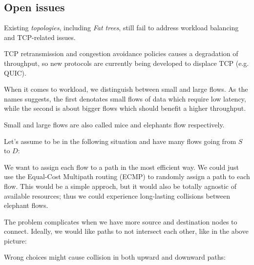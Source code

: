 \subsection{Open issues}
Existing \emph{topologies}, including \emph{Fat trees}, still fail to address
workload balancing and TCP-related issues.

\begin{note}
    TCP retransmission and congestion avoidance policies causes a degradation
    of throughput, so new protocols are currently being developed to displace
    TCP (e.g. QUIC).
\end{note}

\noindent
When it comes to workload, we distinguish between small and large flows. As the
names suggests, the first denotates small flows of data which require low
latency, while the second is about bigger flows which should benefit a higher
throughput.

\begin{note}
    Small and large flows are also called mice and elephants flow respectively.
\end{note}

\begin{eg}
Let's assume to be in the following situation and have many flows going from
$S$ to $D$:

\begin{figure}[h!]
    \centering
\end{figure}

\noindent
We want to assign each flow to a path in the most efficient way. We could just
use the Equal-Cost Multipath routing (ECMP) to randomly assign a path to each
flow. This would be a simple approch, but it would also be totally agnostic of
available resources; thus we could experience long-lasting collisions between
elephant flows.

\begin{figure}[h!]
    \centering
\end{figure}

\noindent
The problem complicates when we have more source and destination nodes to
connect. Ideally, we would like paths to not intersect each other, like in the
above picture:

\begin{figure}[h!]
    \centering
\end{figure}

\noindent
Wrong choices might cause collision in both upward and downward paths:
\begin{figure}[ht!]
    \centering
    \hspace{1.5cm}
\end{figure}
\end{eg}

